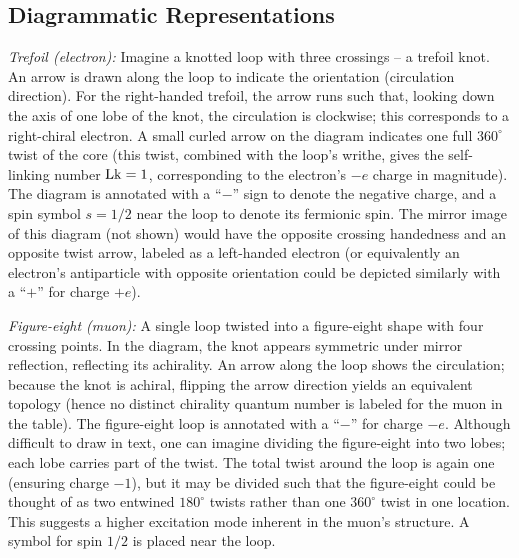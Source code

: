 \documentclass[12pt]{article}
\begin{document}
\subsection*{Diagrammatic Representations}
\emph{Trefoil (electron):} Imagine a knotted loop with three crossings – a trefoil knot. An arrow is drawn along the loop to indicate the orientation (circulation direction). For the right-handed trefoil, the arrow runs such that, looking down the axis of one lobe of the knot, the circulation is clockwise; this corresponds to a right-chiral electron. A small curled arrow on the diagram indicates one full $360^\circ$ twist of the core (this twist, combined with the loop’s writhe, gives the self-linking number ${\rm Lk}=1$, corresponding to the electron’s $-e$ charge in magnitude). The diagram is annotated with a “$-$” sign to denote the negative charge, and a spin symbol $s=1/2$ near the loop to denote its fermionic spin. The mirror image of this diagram (not shown) would have the opposite crossing handedness and an opposite twist arrow, labeled as a left-handed electron (or equivalently an electron’s antiparticle with opposite orientation could be depicted similarly with a “$+$” for charge $+e$).

\emph{Figure-eight (muon):} A single loop twisted into a figure-eight shape with four crossing points. In the diagram, the knot appears symmetric under mirror reflection, reflecting its achirality. An arrow along the loop shows the circulation; because the knot is achiral, flipping the arrow direction yields an equivalent topology (hence no distinct chirality quantum number is labeled for the muon in the table). The figure-eight loop is annotated with a “$-$” for charge $-e$. Although difficult to draw in text, one can imagine dividing the figure-eight into two lobes; each lobe carries part of the twist. The total twist around the loop is again one (ensuring charge $-1$), but it may be divided such that the figure-eight could be thought of as two entwined $180^\circ$ twists rather than one $360^\circ$ twist in one location. This suggests a higher excitation mode inherent in the muon’s structure. A symbol for spin $1/2$ is placed near the loop.
\end{document}
